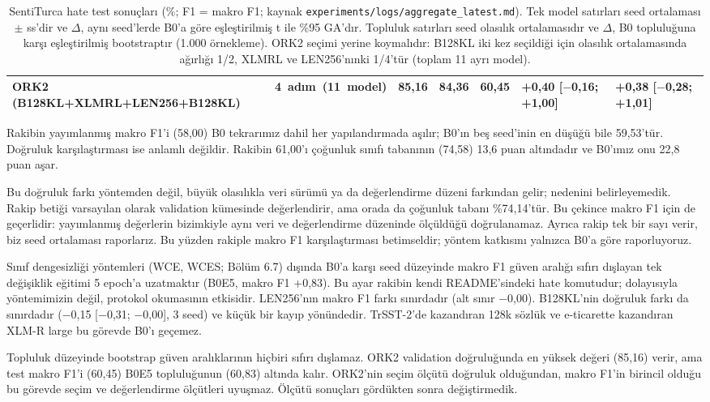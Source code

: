 \documentclass[11pt]{article}
\begin{document}
\begin{table}[!htbp]
{\begin{tabular}{lrrrrll}
ORK2 (B128KL+XLMRL+LEN256+B128KL) & \mbox{4 adım (11 model)} & \mbox{85,16} & \mbox{84,36} & \mbox{60,45} & +0,40 [$-$0,16; +1,00] & +0,38 [$-$0,28; +1,01] \\
\bottomrule
\end{tabular}
}
\caption{SentiTurca hate test sonuçları (\%; F1 = makro F1; kaynak \texttt{experiments/\allowbreak{}\allowbreak{}logs/\allowbreak{}\allowbreak{}aggregate\_\allowbreak{}\allowbreak{}latest.\allowbreak{}\allowbreak{}md}). Tek model satırları seed ortalaması $\pm$ ss'dir ve $\Delta$, aynı seed'lerde B0'a göre eşleştirilmiş t ile \%95 GA'dır. Topluluk satırları seed olasılık ortalamasıdır ve $\Delta$, B0 topluluğuna karşı eşleştirilmiş bootstraptır (1.000 örnekleme). ORK2 seçimi yerine koymalıdır: B128KL iki kez seçildiği için olasılık ortalamasında ağırlığı 1/2, XLMRL ve LEN256'nınki 1/4'tür (toplam 11 ayrı model).}
\label{tab:12}
\end{table}

Rakibin yayımlanmış makro F1'i (58,00) B0 tekrarımız dahil her yapılandırmada aşılır; B0'ın beş seed'inin en düşüğü bile 59,53'tür. Doğruluk karşılaştırması ise anlamlı değildir. Rakibin 61,00'ı çoğunluk sınıfı tabanının (74,58) 13,6 puan altındadır ve B0'ımız onu 22,8 puan aşar.

Bu doğruluk farkı yöntemden değil, büyük olasılıkla veri sürümü ya da değerlendirme düzeni farkından gelir; nedenini belirleyemedik. Rakip betiği varsayılan olarak validation kümesinde değerlendirir, ama orada da çoğunluk tabanı \%74,14'tür. Bu çekince makro F1 için de geçerlidir: yayımlanmış değerlerin bizimkiyle aynı veri ve değerlendirme düzeninde ölçüldüğü doğrulanamaz. Ayrıca rakip tek bir sayı verir, biz seed ortalaması raporlarız. Bu yüzden rakiple makro F1 karşılaştırması betimseldir; yöntem katkısını yalnızca B0'a göre raporluyoruz.

Sınıf dengesizliği yöntemleri (WCE, WCES; Bölüm 6.7) dışında B0'a karşı seed düzeyinde makro F1 güven aralığı sıfırı dışlayan tek değişiklik eğitimi 5 epoch'a uzatmaktır (B0E5, makro F1 +0,83). Bu ayar rakibin kendi README'sindeki hate komutudur; dolayısıyla yöntemimizin değil, protokol okumasının etkisidir. LEN256'nın makro F1 farkı sınırdadır (alt sınır $-$0,00). B128KL'nin doğruluk farkı da sınırdadır ($-$0,15 [$-$0,31; $-$0,00], 3 seed) ve küçük bir kayıp yönündedir. TrSST-2'de kazandıran 128k sözlük ve e-ticarette kazandıran XLM-R large bu görevde B0'ı geçemez.

Topluluk düzeyinde bootstrap güven aralıklarının hiçbiri sıfırı dışlamaz. ORK2 validation doğruluğunda en yüksek değeri (85,16) verir, ama test makro F1'i (60,45) B0E5 topluluğunun (60,83) altında kalır. ORK2'nin seçim ölçütü doğruluk olduğundan, makro F1'in birincil olduğu bu görevde seçim ve değerlendirme ölçütleri uyuşmaz. Ölçütü sonuçları gördükten sonra değiştirmedik.
\end{document}
